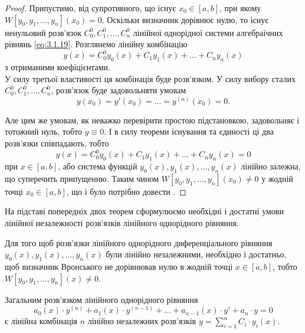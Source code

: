 \begin{proof}
	Припустимо, від супротивного, що існує $x_0 \in [a,b]$, при якому $W[y_0, y_1, \ldots, y_n](x_0) = 0$. Оскільки визначник дорівнює нулю, то існує ненульовий розв’язок $C_0^0, C_1^0, \ldots, C_n^0$ лінійної однорідної системи алгебраїчних рівнянь \eqref{eq:3.1.19}. Розглянемо лінійну комбінацію 
	\begin{equation}
		\label{eq:3.1.21}
		y(x) = C_0^0 y_0(x) + C_1 y_1(x) + \ldots + C_n y_n(x)
	\end{equation}
	з отриманими коефіцієнтами. \\

	У силу третьої властивості ця комбінація буде розв’язком. У силу вибору сталих $C_0^0, C_1^0, \ldots, C_n^0$, розв’язок буде задовольняти умовам
	\begin{equation}
		\label{eq:3.1.22}
		y(x_0) = y'(x_0) = \ldots = y^{(n)}(x_0) = 0.
	\end{equation}
 
	Але цим же умовам, як неважко перевірити простою підстановкою, задовольняє і тотожний нуль, тобто $y \equiv 0$. І в силу теореми існування та єдиності ці два розв’язки співпадають, тобто 
	\begin{equation}
		\label{eq:3.1.23}
		y(x) = C_0^0 y_0(x) + C_1 y_1(x) + \ldots + C_n y_n(x) = 0
	\end{equation}
	при $x \in [a,b]$, або система функцій $y_0(x), y_1(x), \ldots, y_n(x)$ лінійно залежна, що суперечить припущенню. Таким чином $W[y_0, y_1, \ldots, y_n](x_0) \ne 0$ у жодній точці $x_0 \in [a,b]$, що і було потрібно довести .
\end{proof}

На підставі попередніх двох теорем сформулюємо необхідні і достатні умови лінійної незалежності розв’язків лінійного однорідного рівняння.

\begin{theorem}
	Для того щоб розв’язки лінійного однорідного диференціального рівняння $y_0(x), y_1(x), \ldots, y_n(x)$ були лінійно незалежними, необхідно і достатньо, щоб визначник Вронського не дорівнював нулю в жодній точці $x \in [a,b]$, тобто $W[y_0, y_1, \ldots, y_n](x) \ne 0$.
\end{theorem}

\begin{theorem}
	Загальним розв’язком лінійного однорідного рівняння
	\begin{equation}
		\label{eq:3.1.24}
		a_0(x) \cdot y^{(n)} + a_1(x) \cdot y^{(n-1)} + \ldots + a_{n-1}(x) \cdot y' + a_n \cdot y = 0
	\end{equation}
 	є лінійна комбінація $n$ лінійно незалежних розв’язків $y = \sum_{i = 1}^n C_i \cdot y_i(x)$.
\end{theorem}

